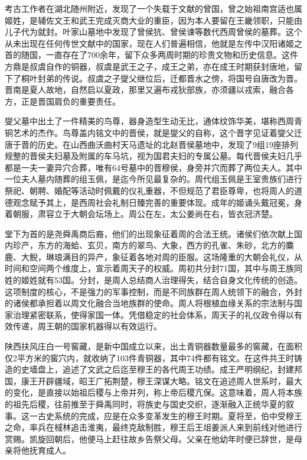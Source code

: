 考古工作者在湖北随州附近，发现了一个失载于文献的曾国，曾之始祖南宫适也属姬姓，是辅佐文王和武王完成灭商大业的重臣，因为本人要留在王畿领职，只能由儿子代为就封。叶家山墓地中发现了曾侯犺、曾侯谏等数代西周曾侯的墓葬。这个从未出现在任何传世文献中的国家，现在人们普遍相信，他就是左传中汉阳诸姬之首的随国，一直存在了700余年，留下众多两周时期的珍贵文物和历史信息。这件方鼎是叔虞自作的铜器，叔虞是武王之子，成王之弟，亦在成王时期获封唐地，留下了桐叶封弟的传说。叔虞之子燮父继位后，迁都晋水之傍，将国号自唐改为晋。晋南是夏人故地，自然启以夏政，那里又遍布戎狄部族，亦须疆以戎索，融合各方，正是晋国肩负的重要责任。

燮父墓中出土了一件精美的鸟尊，器身造型生动无比，通体纹饰华美，堪称西周青铜艺术的杰作。鸟尊盖内铭文中的晋侯，就是燮父的自称，这个晋字见证着燮父迁唐于晋的历史。在山西曲沃曲村天马遗址的北赵晋侯墓地中，发现了9组19座排列规整的晋侯夫妇墓及附属的车马坑，视为国君夫妇的专属公墓。每代晋侯夫妇几乎都是一夫一妻异穴合葬，唯有64号墓中的晋穆侯，身旁并穴而葬了两位夫人。其中一位夫人墓内随葬的组玉佩，是迄今所见最复杂的。周代组玉佩是王室贵族们进行祭祀、朝聘、婚配等活动时佩戴的仪礼重器，不但规范了君臣尊卑，也将周人的道德观念赋予其上，是西周社会礼制日臻完善的重要体现。成年的姬诵头戴冠冕，身着朝服，肃容立于大朝会坛场上。周公在左，太公姜尚在右，皆衣冠济楚。

堂下为首的是尧舜禹商后裔，他们的出现象征着周的合法王统。诸侯们依次献上国内珍产，东方的海蛤、玄贝，南方的翠鸟、大象，西方的孔雀、朱砂，北方的麋鹿、大鲵，琳琅满目的异产，象征着各地对周的臣服。这场隆重的大朝会礼仪，从时间和空间两个维度上，宣示着周天子的权威。周初共分封71国，其中与周王族同姓的姬姓就有53国。分封，是周人总结商人治理得失，结合自身文化传统的创造。这项制度的核心，不是强力的军事控制，而是不同族群在周人统领下的融合，外封的诸侯都承担着以周文化融合当地族群的使命。周人将根植血缘关系的宗法制与国家治理紧密联系，使得家国一体。凭借稳定的社会体系，周天子的礼仪政令得以有效传递，周王朝的国家机器得以有效运行。

陕西扶风庄白一号窖藏，是新中国成立以来，出土青铜器数量最多的窖藏，在面积仅2平方米的窖穴内，就收纳了103件青铜器，其中74件都有铭文。在这件共王时铸造的史墙盘上，追述了文武之后迄至穆王的各代周王功绩。成王严明纲纪，封建邦国，康王开辟疆域，昭王广拓荆楚，穆王深谋大略。铭文在追述周人世系时，最大的变化，是直接以始祖后稷与上帝并列，称上帝后稷亢保。这意味着，周人将本族的祖先后稷，往前推至于舜禹同时，将族史与国史交织，逐渐融入正统华夏的叙事。这一古史系统的完成，应是在众多变革发生的穆王时期。夏将至，伯中受穆王之命，率兵在棫林追击淮夷，最终克敌制胜，穆王后王俎姜派人来到前线对他进行赏赐。凯旋回朝后，他便马上赶往故乡告祭父母。父亲在他幼年时便已辞世，是母亲将他抚育成人。

